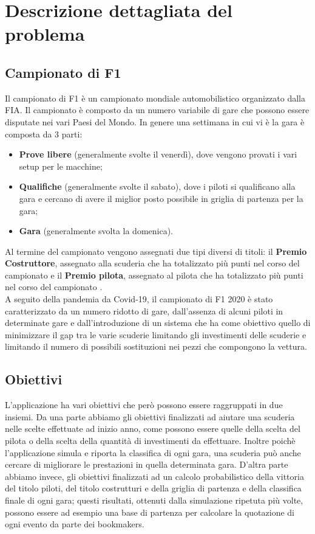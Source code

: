 \chapter{Descrizione dettagliata del problema}
\label{sec:descrizione dettagliata del problema}


\section[Campionato di F1]{Campionato di F1} %
Il campionato di F1 è un campionato mondiale automobilistico organizzato dalla FIA. Il campionato è composto da un numero variabile di gare che possono essere disputate nei vari Paesi del Mondo. In genere una settimana in cui vi è la gara è composta da 3 parti: 
\begin{itemize}
\item \textbf{Prove libere} (generalmente svolte il venerdì), dove vengono provati i vari setup per le macchine;
\item \textbf{Qualifiche} (generalmente svolte il sabato), dove i piloti si qualificano alla gara e cercano di avere il miglior posto possibile in griglia di partenza per la gara;
\item \textbf{Gara} (generalmente svolta la domenica).
\end{itemize}
Al termine del campionato vengono assegnati due tipi diversi di titoli: il \textbf{Premio Costruttore}, assegnato alla scuderia che ha totalizzato più punti nel corso del campionato e il  \textbf{Premio pilota}, assegnato al pilota che ha totalizzato più punti nel corso del campionato  .\\
A seguito della pandemia da Covid-19, il campionato di F1 2020 è stato caratterizzato da un numero ridotto di gare, dall'assenza di alcuni piloti in determinate gare e dall'introduzione di un sistema che ha come obiettivo quello di minimizzare il gap tra le varie scuderie limitando gli investimenti delle scuderie e limitando il numero di possibili sostituzioni nei pezzi che compongono la vettura.

\section[Obiettivi]{Obiettivi} %
L'applicazione ha vari obiettivi che però possono essere raggruppati in due insiemi. Da una parte abbiamo gli obiettivi finalizzati ad aiutare una scuderia nelle scelte effettuate ad inizio anno, come possono essere quelle della scelta del pilota o della scelta della quantità di investimenti da effettuare. Inoltre poichè l'applicazione simula e riporta la classifica di  ogni gara, una scuderia può anche cercare di migliorare le prestazioni in quella determinata gara. D'altra parte abbiamo invece, gli obiettivi finalizzati ad un calcolo probabilistico della vittoria del titolo piloti, del titolo costrutturi e della griglia di partenza e della classifica finale di ogni gara; questi risultati, ottenuti dalla simulazione ripetuta più volte, possono essere ad esempio una base di partenza per calcolare la quotazione di ogni evento da parte dei bookmakers.
